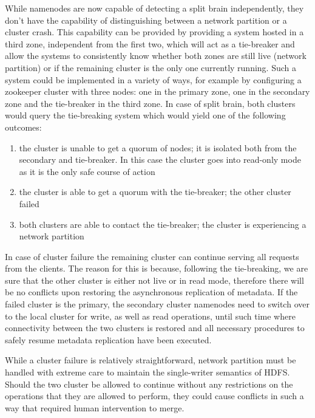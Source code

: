 While namenodes are now capable of detecting a split brain independently, they don't have the capability of distinguishing between a network partition or a cluster crash.
This capability can be provided by providing a system hosted in a third zone, independent from the first two, which will act as a tie-breaker and allow the systems to consistently know whether both zones are still live (network partition) or if the remaining cluster is the only one currently running.
Such a system could be implemented in a variety of ways, for example by configuring a zookeeper cluster \cite{zookeeper} with three nodes: one in the primary zone, one in the secondary zone and the tie-breaker in the third zone.
In case of split brain, both clusters would query the tie-breaking system which would yield one of the following outcomes:
\begin{enumerate}
    \item the cluster is unable to get a quorum of nodes; it is isolated both from the secondary and tie-breaker. In this case the cluster goes into read-only mode as it is the only safe course of action
    \item the cluster is able to get a quorum with the tie-breaker; the other cluster failed
    \item both clusters are able to contact the tie-breaker; the cluster is experiencing a network partition
\end{enumerate}

In case of cluster failure the remaining cluster can continue serving all requests from the clients.
The reason for this is because, following the tie-breaking, we are sure that the other cluster is either not live or in read mode, therefore there will be no conflicts upon restoring the asynchronous replication of metadata.
If the failed cluster is the primary, the secondary cluster namenodes need to switch over to the local cluster for write, as well as read operations, until such time where connectivity between the two clusters is restored and all necessary procedures to safely resume metadata replication have been executed.

While a cluster failure is relatively straightforward, network partition must be handled with extreme care to maintain the single-writer semantics of HDFS.
Should the two cluster be allowed to continue without any restrictions on the operations that they are allowed to perform, they could cause conflicts in such a way that required human intervention to merge.


